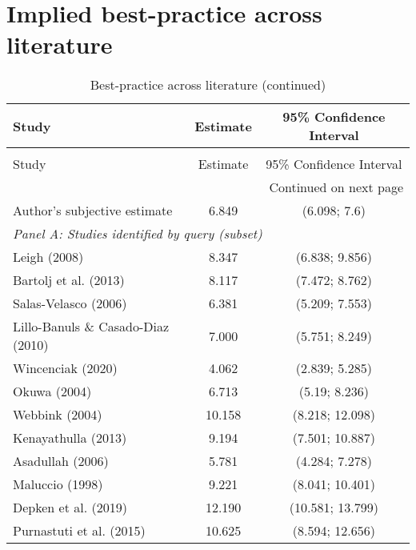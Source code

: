 \chapter{Implied best-practice across literature}
\label{app:four}

\begin{singlespace}
\begin{footnotesize}
\begin{longtable}{
@{\hskip\tabcolsep}
l
*{2}{c}
@{}}
\caption{Comparing best-practice estimates across literature}  \label{tab:BPE_fun}\\
\toprule
    Study & Estimate & 95\% Confidence Interval \\
\midrule
\endfirsthead
\caption[]{Best-practice across literature (continued)}\\
\toprule
    Study & Estimate & 95\% Confidence Interval \\
\midrule
\endhead
\bottomrule
\multicolumn{3}{r}{{\scriptsize Continued on next page}} \\
\endfoot
\endlastfoot
           Author's subjective estimate &  6.849 &     (6.098; 7.6) \\
                                  \midrule
\multicolumn{3}{l}{\textit{Panel A: Studies identified by query (subset)}} \\
                            Leigh (2008) &  8.347 &   (6.838; 9.856) \\
                   Bartolj et al. (2013) &  8.117 &   (7.472; 8.762) \\
                    Salas-Velasco (2006) &  6.381 &   (5.209; 7.553) \\
      Lillo-Banuls \& Casado-Diaz (2010) &  7.000 &   (5.751; 8.249) \\
                       Wincenciak (2020) &  4.062 &   (2.839; 5.285) \\
                            Okuwa (2004) &  6.713 &    (5.19; 8.236) \\
                          Webbink (2004) & 10.158 &  (8.218; 12.098) \\
                     Kenayathulla (2013) &  9.194 &  (7.501; 10.887) \\
                        Asadullah (2006) &  5.781 &   (4.284; 7.278) \\
                         Maluccio (1998) &  9.221 &  (8.041; 10.401) \\
                    Depken et al. (2019) & 12.190 & (10.581; 13.799) \\
                Purnastuti et al. (2015) & 10.625 &  (8.594; 12.656) \\

\end{longtable}
\end{footnotesize}
\end{singlespace}
